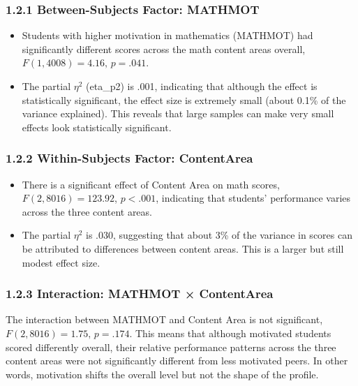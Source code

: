\documentclass[
  letterpaper,
  DIV=11,
  numbers=noendperiod]{scrreprt}
\begin{document}
\subsubsection*{1.2.1 Between-Subjects Factor:
MATHMOT}\label{between-subjects-factor-mathmot}

\begin{itemize}
\item
  Students with higher motivation in mathematics (MATHMOT) had
  significantly different scores across the math content areas overall,
  \(F(1, 4008) = 4.16, \, p = .041\).
\item
  The partial \(\eta^2\) (eta\_p2) is .001, indicating that although the
  effect is statistically significant, the effect size is extremely
  small (about 0.1\% of the variance explained). This reveals that large
  samples can make very small effects look statistically significant.
\end{itemize}

\subsubsection*{1.2.2 Within-Subjects Factor:
ContentArea}\label{within-subjects-factor-contentarea}

\begin{itemize}
\item
  There is a significant effect of Content Area on math scores,
  \(F(2, 8016) = 123.92\), \(p < .001\), indicating that students'
  performance varies across the three content areas.
\item
  The partial \(\eta^2\) is .030, suggesting that about 3\% of the
  variance in scores can be attributed to differences between content
  areas. This is a larger but still modest effect size.
\end{itemize}

\subsubsection*{1.2.3 Interaction: MATHMOT ×
ContentArea}\label{interaction-mathmot-contentarea}

The interaction between MATHMOT and Content Area is not significant,
\(F(2, 8016) = 1.75, \, p= .174\). This means that although motivated
students scored differently overall, their relative performance patterns
across the three content areas were not significantly different from
less motivated peers. In other words, motivation shifts the overall
level but not the shape of the profile.
\end{document}
